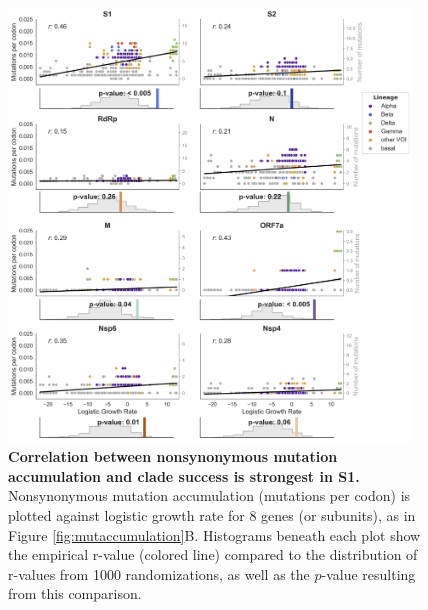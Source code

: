 \documentclass[11pt,oneside,letterpaper]{article}
\begin{document}
\begin{figure}[h!]
\centerline{\includegraphics[width=0.95\textwidth]{fig1_supp_mutaccummoregenes.png}}
\caption{\textbf{Correlation between nonsynonymous mutation accumulation and clade success is strongest in S1.}
Nonsynonymous mutation accumulation (mutations per codon) is plotted against logistic growth rate for 8 genes (or subunits), as in Figure \ref{fig:mutaccumulation}B. Histograms beneath each plot show the empirical r-value (colored line) compared to the distribution of r-values from 1000 randomizations, as well as the $p$-value resulting from this comparison.
}
\label{fig:mutaccummoregenes}
\end{figure}
\end{document}
